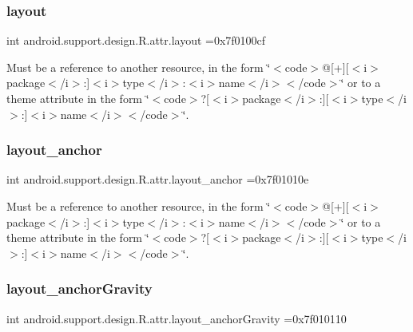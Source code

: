 \subsubsection{\texorpdfstring{layout}{layout}}
{\footnotesize\ttfamily int android.\+support.\+design.\+R.\+attr.\+layout =0x7f0100cf\hspace{0.3cm}{\ttfamily [static]}}

Must be a reference to another resource, in the form \char`\"{}$<$code$>$@\mbox{[}+\mbox{]}\mbox{[}$<$i$>$package$<$/i$>$\+:\mbox{]}$<$i$>$type$<$/i$>$\+:$<$i$>$name$<$/i$>$$<$/code$>$\char`\"{} or to a theme attribute in the form \char`\"{}$<$code$>$?\mbox{[}$<$i$>$package$<$/i$>$\+:\mbox{]}\mbox{[}$<$i$>$type$<$/i$>$\+:\mbox{]}$<$i$>$name$<$/i$>$$<$/code$>$\char`\"{}. \mbox{\label{classandroid_1_1support_1_1design_1_1R_1_1attr_a5491885998551f44c471758e2f47a6ea}} 
\subsubsection{\texorpdfstring{layout\+\_\+anchor}{layout\_anchor}}
{\footnotesize\ttfamily int android.\+support.\+design.\+R.\+attr.\+layout\+\_\+anchor =0x7f01010e\hspace{0.3cm}{\ttfamily [static]}}

Must be a reference to another resource, in the form \char`\"{}$<$code$>$@\mbox{[}+\mbox{]}\mbox{[}$<$i$>$package$<$/i$>$\+:\mbox{]}$<$i$>$type$<$/i$>$\+:$<$i$>$name$<$/i$>$$<$/code$>$\char`\"{} or to a theme attribute in the form \char`\"{}$<$code$>$?\mbox{[}$<$i$>$package$<$/i$>$\+:\mbox{]}\mbox{[}$<$i$>$type$<$/i$>$\+:\mbox{]}$<$i$>$name$<$/i$>$$<$/code$>$\char`\"{}. \mbox{\label{classandroid_1_1support_1_1design_1_1R_1_1attr_a04fb1ebb304aea3c387eb9ad4978be39}} 
\subsubsection{\texorpdfstring{layout\+\_\+anchor\+Gravity}{layout\_anchorGravity}}
{\footnotesize\ttfamily int android.\+support.\+design.\+R.\+attr.\+layout\+\_\+anchor\+Gravity =0x7f010110\hspace{0.3cm}{\ttfamily [static]}}

